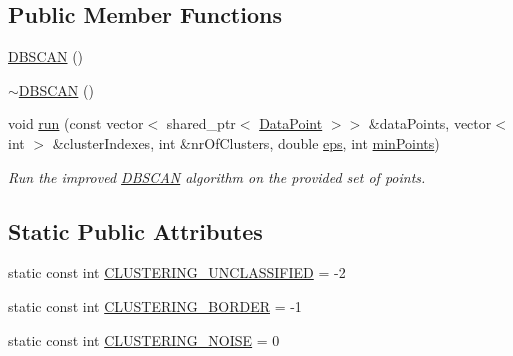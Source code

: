 \subsection*{Public Member Functions}
\begin{DoxyCompactItemize}
\item 
\hyperlink{classmultiscale_1_1analysis_1_1DBSCAN_abcfe88a7c0a94730a128e4682d8f27ca}{D\-B\-S\-C\-A\-N} ()
\item 
\hyperlink{classmultiscale_1_1analysis_1_1DBSCAN_a4deb359da661ba495d18a75f43a0b89c}{$\sim$\-D\-B\-S\-C\-A\-N} ()
\item 
void \hyperlink{classmultiscale_1_1analysis_1_1DBSCAN_a52f0eb2d04029c75a3c48a37efdac26b}{run} (const vector$<$ shared\-\_\-ptr$<$ \hyperlink{classmultiscale_1_1analysis_1_1DataPoint}{Data\-Point} $>$$>$ \&data\-Points, vector$<$ int $>$ \&cluster\-Indexes, int \&nr\-Of\-Clusters, double \hyperlink{classmultiscale_1_1analysis_1_1DBSCAN_a8d68cd84561cbb06bd138f8edf340b9f}{eps}, int \hyperlink{classmultiscale_1_1analysis_1_1DBSCAN_a7bafd4070ac44e236fcc7f06d92b6572}{min\-Points})
\begin{DoxyCompactList}\small\item\em Run the improved \hyperlink{classmultiscale_1_1analysis_1_1DBSCAN}{D\-B\-S\-C\-A\-N} algorithm on the provided set of points. \end{DoxyCompactList}\end{DoxyCompactItemize}
\subsection*{Static Public Attributes}
\begin{DoxyCompactItemize}
\item 
static const int \hyperlink{classmultiscale_1_1analysis_1_1DBSCAN_a6f60961639281a807b63650faf01511b}{C\-L\-U\-S\-T\-E\-R\-I\-N\-G\-\_\-\-U\-N\-C\-L\-A\-S\-S\-I\-F\-I\-E\-D} = -\/2
\item 
static const int \hyperlink{classmultiscale_1_1analysis_1_1DBSCAN_a28f37ffc029ccd1d121cbc4467851ce2}{C\-L\-U\-S\-T\-E\-R\-I\-N\-G\-\_\-\-B\-O\-R\-D\-E\-R} = -\/1
\item 
static const int \hyperlink{classmultiscale_1_1analysis_1_1DBSCAN_a480b43a01f8652787a4b0f61b00ee3cf}{C\-L\-U\-S\-T\-E\-R\-I\-N\-G\-\_\-\-N\-O\-I\-S\-E} = 0
\end{DoxyCompactItemize}
